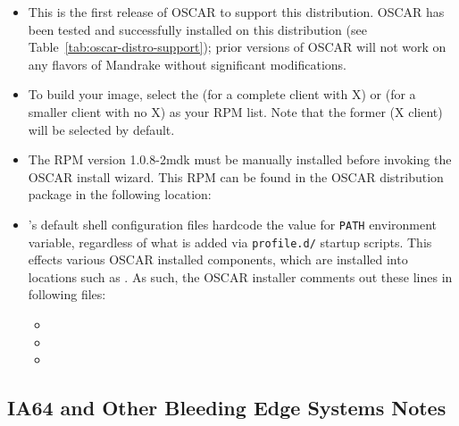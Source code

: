 \begin{itemize}
\item This is the first release of OSCAR to support this distribution.
  OSCAR \oscarversion\- has been tested and successfully installed on
  this distribution (see Table~\ref{tab:oscar-distro-support}); prior
  versions of OSCAR will not work on any flavors of Mandrake without
  significant modifications.
  
\item To build your image, select the
   (for a complete client
  with X) or  (for a
  smaller client with no X) as your RPM list.  Note that the former (X
  client) will be selected by default.
  
\item The  RPM version 1.0.8-2mdk must be manually
  installed before invoking the OSCAR install wizard.  This RPM can be
  found in the OSCAR distribution package in the following location:\\
  
\item {}'s default shell configuration files hardcode the
  value for {\tt PATH} environment variable, regardless of what is
  added via {\tt profile.d/} startup scripts.  This effects various
  OSCAR installed components, which are installed into locations such
  as .  As such, the OSCAR installer comments out these
  lines in following files:

  \begin{itemize}
  \item {}
  \item {}
  \item {}
  \end{itemize}

\end{itemize}


\subsection{IA64 and Other Bleeding Edge Systems Notes}
\label{subsec:ia64notes}

